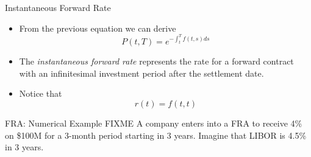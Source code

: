 \documentclass{beamer}
\begin{document}
\begin{frame}{Instantaneous Forward Rate}
	\begin{itemize}
		\item From the previous equation we can derive
		\begin{equation}
			P(t, T) = e^{-\int_t^T f(t, s) ds}
		\end{equation}
		\item The \emph{instantaneous forward rate} represents the rate for a forward contract with an infinitesimal investment period after the settlement date.
		\item Notice that
		\begin{equation*}
			r(t) = f(t,t)
		\end{equation*}
	\end{itemize}
\end{frame}

\begin{frame}[fragile]{FRA: Numerical Example FIXME}
A company enters into a FRA to receive 4\% on \$100M for a 3-month period starting in 3 years. Imagine that LIBOR is 4.5\% in 3 years.

%
%
%
\end{frame}
\end{document}
